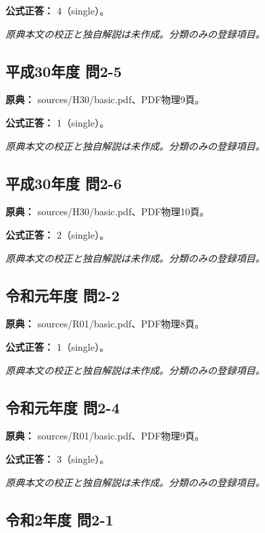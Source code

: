\textbf{公式正答：} 4（single）。

\par\textit{原典本文の校正と独自解説は未作成。分類のみの登録項目。}

\subsection{平成30年度 問2-5}
\label{q:h30-reg-basic-2-5}

\noindent\textbf{原典：} sources/H30/basic.pdf、PDF物理9頁。

\textbf{公式正答：} 1（single）。

\par\textit{原典本文の校正と独自解説は未作成。分類のみの登録項目。}

\subsection{平成30年度 問2-6}
\label{q:h30-reg-basic-2-6}

\noindent\textbf{原典：} sources/H30/basic.pdf、PDF物理10頁。

\textbf{公式正答：} 2（single）。

\par\textit{原典本文の校正と独自解説は未作成。分類のみの登録項目。}

\subsection{令和元年度 問2-2}
\label{q:r01-reg-basic-2-2}

\noindent\textbf{原典：} sources/R01/basic.pdf、PDF物理8頁。

\textbf{公式正答：} 1（single）。

\par\textit{原典本文の校正と独自解説は未作成。分類のみの登録項目。}

\subsection{令和元年度 問2-4}
\label{q:r01-reg-basic-2-4}

\noindent\textbf{原典：} sources/R01/basic.pdf、PDF物理9頁。

\textbf{公式正答：} 3（single）。

\par\textit{原典本文の校正と独自解説は未作成。分類のみの登録項目。}

\subsection{令和2年度 問2-1}
\label{q:r02-reg-basic-2-1}

